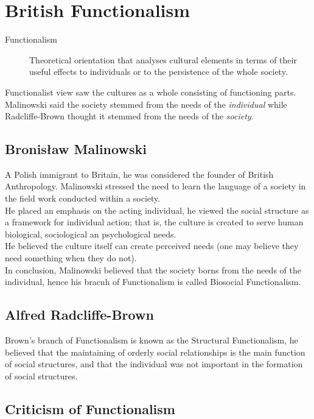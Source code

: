 \documentclass[11pt,a4paper]{book}
\begin{document}
\section{British Functionalism}
\begin{description}
\item[Functionalism] Theoretical orientation that analyses cultural elements in terms of their useful effects to individuals or to the persistence of the whole society.
\end{description}

Functionalist view saw the cultures as a whole consisting of functioning parts. Malinowski said the society stemmed from the needs of the \textit{individual} while Radcliffe-Brown thought it stemmed from the needs of the \textit{society}.

\subsection{Bronisław Malinowski}

A Polish immigrant to Britain, he was considered the founder of British Anthropology. Malinowski stressed the need to learn the language of a society in the field work conducted within a society.\\

He placed an emphasis on the acting individual, he viewed the social structure as a framework for individual action; that is, the culture is created to serve human biological, sociological an psychological needs.\\

He believed the culture itself can create perceived needs (one may believe they need something when they do not).\\

In conclusion, Malinowski believed that the society borns from the needs of the individual, hence his bracnh of Functionalism is called Biosocial Functionalism.

\subsection{Alfred Radcliffe-Brown}

Brown's branch of Functionalism is known as the Structural Functionalism, he believed that the maintaining of orderly social relationships is the main function of social structures, and that the individual was not important in the formation of social structures.

\subsection{Criticism of Functionalism}
\end{document}
